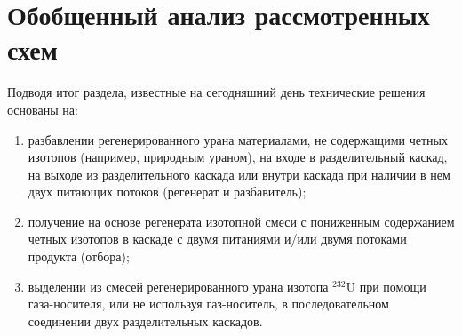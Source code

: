 \section{Обобщенный анализ рассмотренных схем}

Подводя итог раздела, известные на сегодняшний день технические решения основаны на:
\begin{enumerate}
  \item разбавлении регенерированного урана материалами, не содержащими четных изотопов (например, природным ураном), на входе в разделительный каскад, на выходе из разделительного каскада или внутри каскада при наличии в нем двух питающих потоков (регенерат и разбавитель);
  \item получение на основе регенерата изотопной смеси с пониженным содержанием четных изотопов в каскаде с двумя питаниями и/или двумя потоками продукта (отбора);
  \item выделении из смесей регенерированного урана изотопа $^{232}$U при помощи газа-носителя, или не используя газ-носитель, в последовательном соединении двух разделительных каскадов.
\end{enumerate}

